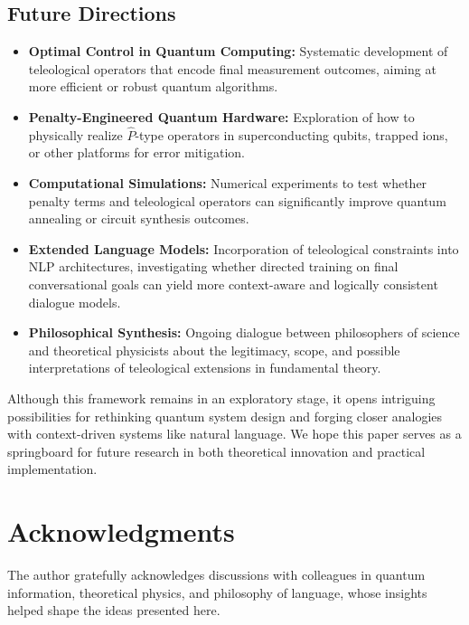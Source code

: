 \documentclass[11pt]{article}
\begin{document}
\subsection{Future Directions}
\begin{itemize}
    \item \textbf{Optimal Control in Quantum Computing:} Systematic development of teleological operators that encode final measurement outcomes, aiming at more efficient or robust quantum algorithms.
    \item \textbf{Penalty-Engineered Quantum Hardware:} Exploration of how to physically realize $\hat{P}$-type operators in superconducting qubits, trapped ions, or other platforms for error mitigation.
    \item \textbf{Computational Simulations:} Numerical experiments to test whether penalty terms and teleological operators can significantly improve quantum annealing or circuit synthesis outcomes.
    \item \textbf{Extended Language Models:} Incorporation of teleological constraints into NLP architectures, investigating whether directed training on final conversational goals can yield more context-aware and logically consistent dialogue models.
    \item \textbf{Philosophical Synthesis:} Ongoing dialogue between philosophers of science and theoretical physicists about the legitimacy, scope, and possible interpretations of teleological extensions in fundamental theory.
\end{itemize}

Although this framework remains in an exploratory stage, it opens intriguing possibilities for rethinking quantum system design and forging closer analogies with context-driven systems like natural language. We hope this paper serves as a springboard for future research in both theoretical innovation and practical implementation.

\section*{Acknowledgments}
The author gratefully acknowledges discussions with colleagues in quantum information, theoretical physics, and philosophy of language, whose insights helped shape the ideas presented here.
\end{document}
